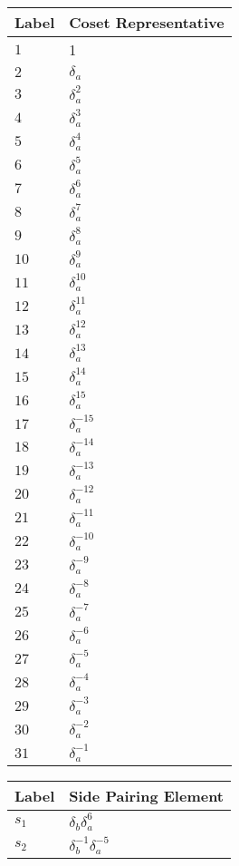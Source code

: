 \documentclass{article}
\begin{document}
\begin{center}
\begin{tabular}{ll}
\toprule
Label & Coset Representative\\
\midrule
$1$ & 1 \\
$2$ & $\delta_a^{}$ \\
$3$ & $\delta_a^{2}$ \\
$4$ & $\delta_a^{3}$ \\
$5$ & $\delta_a^{4}$ \\
$6$ & $\delta_a^{5}$ \\
$7$ & $\delta_a^{6}$ \\
$8$ & $\delta_a^{7}$ \\
$9$ & $\delta_a^{8}$ \\
$10$ & $\delta_a^{9}$ \\
$11$ & $\delta_a^{10}$ \\
$12$ & $\delta_a^{11}$ \\
$13$ & $\delta_a^{12}$ \\
$14$ & $\delta_a^{13}$ \\
$15$ & $\delta_a^{14}$ \\
$16$ & $\delta_a^{15}$ \\
$17$ & $\delta_a^{-15}$ \\
$18$ & $\delta_a^{-14}$ \\
$19$ & $\delta_a^{-13}$ \\
$20$ & $\delta_a^{-12}$ \\
$21$ & $\delta_a^{-11}$ \\
$22$ & $\delta_a^{-10}$ \\
$23$ & $\delta_a^{-9}$ \\
$24$ & $\delta_a^{-8}$ \\
$25$ & $\delta_a^{-7}$ \\
$26$ & $\delta_a^{-6}$ \\
$27$ & $\delta_a^{-5}$ \\
$28$ & $\delta_a^{-4}$ \\
$29$ & $\delta_a^{-3}$ \\
$30$ & $\delta_a^{-2}$ \\
$31$ & $\delta_a^{-1}$ \\
\bottomrule
\end{tabular}
\hfill
\begin{tabular}{ll}
\toprule
Label & Side Pairing Element\\
\midrule
$s_{1}$ & $\delta_b^{}\delta_a^{6}$ \\
$s_{2}$ & $\delta_b^{-1}\delta_a^{-5}$ \\

\end{tabular}
\end{center}
\end{document}
